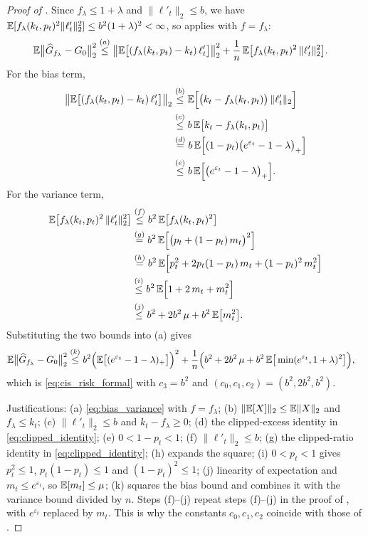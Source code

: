 \begin{proof}[Proof of ]
Since $f_\lambda\le1+\lambda$ and $\|\ell'_t\|_2\le b$, we have
$\mathbb{E}[f_\lambda(k_t,p_t)^2\|\ell'_t\|_2^2]\le b^2(1+\lambda)^2<\infty$, so
 applies with $f=f_\lambda$:
\begin{align*}
\mathbb{E}\big\|\widehat G_{f_\lambda}-G_0\big\|_2^2
&\overset{(a)}{\le} \big\|\mathbb{E}\big[(f_\lambda(k_t,p_t)-k_t)\,\ell'_t\big]\big\|_2^2
+\frac1n\,\mathbb{E}\big[f_\lambda(k_t,p_t)^2\,\|\ell'_t\|_2^2\big].
\end{align*}
For the bias term,
\begin{align*}
\big\|\mathbb{E}\big[(f_\lambda(k_t,p_t)-k_t)\,\ell'_t\big]\big\|_2
&\overset{(b)}{\le} \mathbb{E}\Big[\big(k_t-f_\lambda(k_t,p_t)\big)\,\|\ell'_t\|_2\Big]\\
&\overset{(c)}{\le} b\,\mathbb{E}\big[k_t-f_\lambda(k_t,p_t)\big]\\
&\overset{(d)}{=} b\,\mathbb{E}\Big[(1-p_t)\big(e^{\varepsilon_t}-1-\lambda\big)_+\Big]\\
&\overset{(e)}{\le} b\,\mathbb{E}\Big[\big(e^{\varepsilon_t}-1-\lambda\big)_+\Big].
\end{align*}
For the variance term,
\begin{align*}
\mathbb{E}\big[f_\lambda(k_t,p_t)^2\,\|\ell'_t\|_2^2\big]
&\overset{(f)}{\le} b^2\,\mathbb{E}\big[f_\lambda(k_t,p_t)^2\big]\\
&\overset{(g)}{=} b^2\,\mathbb{E}\Big[\big(p_t+(1-p_t)\,m_t\big)^2\Big]\\
&\overset{(h)}{=} b^2\,\mathbb{E}\Big[p_t^2+2p_t(1-p_t)\,m_t+(1-p_t)^2\,m_t^2\Big]\\
&\overset{(i)}{\le} b^2\,\mathbb{E}\Big[1+2\,m_t+m_t^2\Big]\\
&\overset{(j)}{\le} b^2+2b^2\,\mu+b^2\,\mathbb{E}\big[m_t^2\big].
\end{align*}
Substituting the two bounds into (a) gives
\begin{align*}
\mathbb{E}\big\|\widehat G_{f_\lambda}-G_0\big\|_2^2
&\overset{(k)}{\le} b^2\Big(\mathbb{E}\big[(e^{\varepsilon_t}-1-\lambda)_+\big]\Big)^2
+\frac1n\Big(b^2+2b^2\,\mu+b^2\,\mathbb{E}\big[\min(e^{\varepsilon_t},1+\lambda)^2\big]\Big),
\end{align*}
which is \eqref{eq:cis_risk_formal} with $c_3=b^2$ and
$(c_0,c_1,c_2)=(b^2,2b^2,b^2)$.

Justifications:
(a) \eqref{eq:bias_variance} with $f=f_\lambda$;
(b) $\|\mathbb{E}[X]\|_2\le\mathbb{E}\|X\|_2$ and $f_\lambda\le k_t$;
(c) $\|\ell'_t\|_2\le b$ and $k_t-f_\lambda\ge0$;
(d) the clipped-excess identity in \eqref{eq:clipped_identity};
(e) $0<1-p_t<1$;
(f) $\|\ell'_t\|_2\le b$;
(g) the clipped-ratio identity in \eqref{eq:clipped_identity};
(h) expands the square;
(i) $0<p_t<1$ gives $p_t^2\le1$, $p_t(1-p_t)\le1$ and $(1-p_t)^2\le1$;
(j) linearity of expectation and $m_t\le e^{\varepsilon_t}$, so
$\mathbb{E}[m_t]\le\mu$;
(k) squares the bias bound and combines it with the variance bound divided by
$n$.
Steps (f)--(j) repeat steps (f)--(j) in the proof of ,
with $e^{\varepsilon_t}$ replaced by $m_t$. This is why the constants
$c_0,c_1,c_2$ coincide with those of .
\end{proof}

